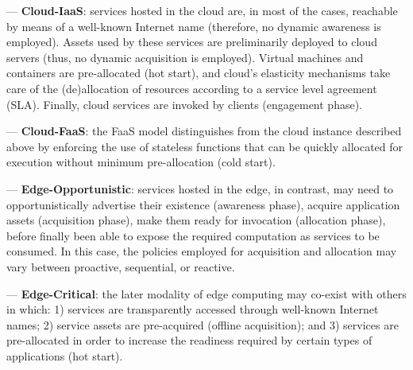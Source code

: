 --- \textbf{Cloud-IaaS}: services hosted in the cloud are, in most of the cases, reachable by means of a well-known Internet name (therefore, no dynamic awareness is employed). Assets used by these services are preliminarily deployed to cloud servers (thus, no dynamic acquisition is employed). Virtual machines and containers are pre-allocated (hot start), and cloud's elasticity mechanisms take care of the (de)allocation of resources according to a service level agreement (SLA). Finally, cloud services are invoked by clients (engagement phase). 

--- \textbf{Cloud-FaaS}: the FaaS model distinguishes from the cloud instance described above by enforcing the use of stateless functions that can be quickly allocated for execution without minimum pre-allocation (cold start).

--- \textbf{Edge-Opportunistic}: services hosted in the edge, in contrast, may need to opportunistically advertise their existence (awareness phase), acquire application assets (acquisition phase), make them ready for invocation (allocation phase), before finally been able to expose the required computation as services to be consumed. In this case, the policies employed for acquisition and allocation may vary between proactive, sequential, or reactive. 

--- \textbf{Edge-Critical}: the later modality of edge computing may co-exist with others in which: 1) services are transparently accessed through well-known Internet names; 2) service assets are pre-acquired (offline acquisition); and 3) services are pre-allocated in order to increase the readiness required by certain types of applications (hot start). 


